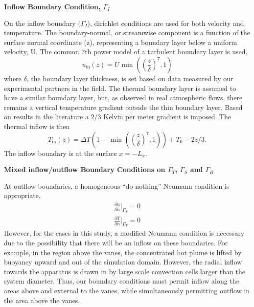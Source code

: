 \textbf{Inflow Boundary Condition, $\Gamma_I$} 

On the inflow boundary $(\Gamma_I$), dirichlet conditions are used for both
velocity and temperature. The boundary-normal, or streamwise component 
is a function of the surface normal coordinate (z), representing a boundary 
layer below a uniform velocity, U.
The common 7th power model of a turbulent boundary layer is used,   
\begin{equation*}
  u_{\text{in}}(z) = U \text{ min }\left(\left(\frac{z}{\delta}\right)^7,1\right)
  \label{eq:bl_u}
\end{equation*}
where $\delta$, the boundary layer thickness, is set based on data
measured by our experimental partners in the field. 
The thermal boundary layer is assumed to have a similar boundary layer,
but, as observed in real atmospheric flows, there remains a vertical
temperature gradient outside the thin boundary layer. Based on
results in the literature a $2/3$ Kelvin per meter gradient is 
imposed\cite{Blocken2007238}. The thermal inflow is then  
\begin{equation*}
  T_{\text{in}}(z) = \Delta T \left(1- \text{ min
			}\left(\left(\frac{z}{\delta}\right)^7,1\right)\right)
  + T_0 - 2z/3.  
  \label{eq:bl_t}
\end{equation*}
The inflow boundary is at the surface $x=-L_x$.

\textbf{Mixed inflow/outflow Boundary Conditions on $\Gamma_T$,
$\Gamma_S$ and $\Gamma_B$}  

At outflow boundaries, a homogeneous ``do nothing'' Neumann condition is
appropriate\cite{Rannacher2000}, 
\begin{align}
  \frac{\partial u}{\partial n}\bigg|_{\Gamma_T} = 0 \\
  \frac{\partial T}{\partial n}\bigg|_{\Gamma_T} = 0
\end{align}
However, for the cases in this study, a modified Neumann condition is
necessary due to the possibility that there will be an inflow on these
boundaries. 
For example, in the region above the vanes, the concentrated hot plume is
lifted by buoyancy upward and out of the simulation domain. However, the
radial inflow towards the apparatus is drawn in by large scale
convection cells larger than the system diameter. Thus, our boundary
conditions must permit inflow along the areas above and external to the
vanes, while simultaneously permitting outflow in the area above the vanes. 


